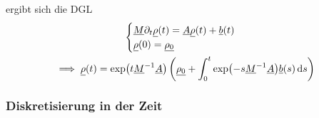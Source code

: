 ergibt sich die DGL
\begin{gather*}
\begin{cases}
\underline{M} \partial_t \underline{\rho}(t) = \underline{A} \underline{\rho}(t) + \underline{b}(t) \\
\underline{\rho}(0) = \underline{\rho_0}
\end{cases}\\
\implies \underline{\rho}(t) = \exp(t \underline{M}^{-1} \underline{A}) \left( \underline{\rho_0} + \int_{0}^{t} \exp(-s\underline{M}^{-1} \underline{A}) \underline{b}(s) \mathop{}\!\mathrm{d} s \right) 
\end{gather*}

\subsubsection{Diskretisierung in der Zeit}

